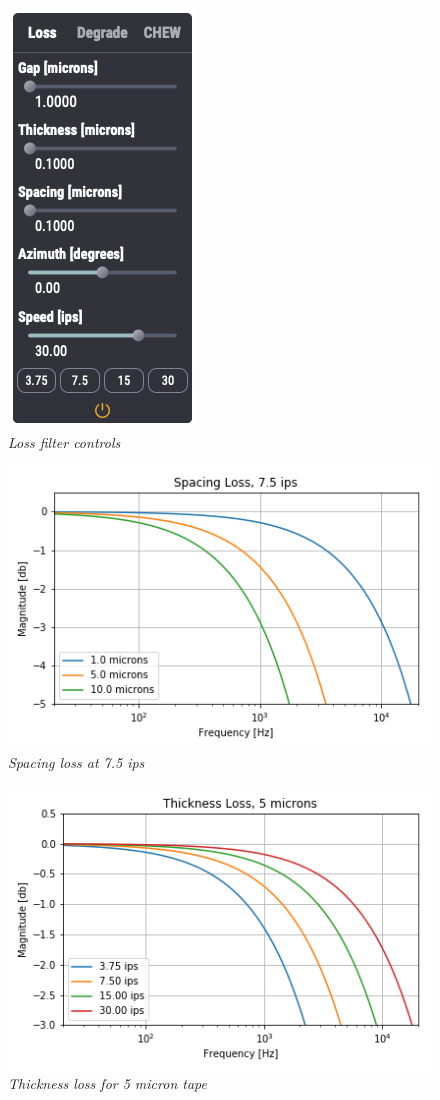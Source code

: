 \documentclass[landscape,twocolumn,a5paper]{manual}
\begin{document}
\begin{figure}[ht]
    \center
    \includegraphics[height=0.45\paperheight]{../Plugin/Screenshots/Loss.png}
    \caption{\label{loss_controls}{\it Loss filter controls}}
\end{figure}
%
\begin{figure}[ht]
    \center
    \includegraphics[width=0.85\columnwidth]{../Simulations/LossEffects/space_loss.png}
    \caption{\label{spacing_loss}{\it Spacing loss at 7.5 ips}}
\end{figure}
%
\begin{figure}[ht]
    \center
    \includegraphics[width=0.85\columnwidth]{../Simulations/LossEffects/speed_thickness.png}
    \caption{\label{thick_loss}{\it Thickness loss for 5 micron tape}}
\end{figure}
\end{document}
